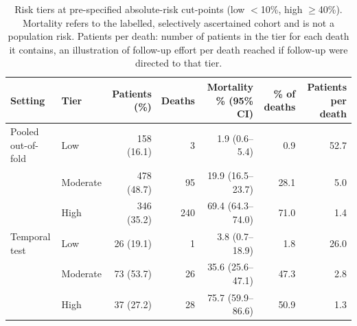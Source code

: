 \begin{table}[htbp]\centering\footnotesize
\caption{Risk tiers at pre-specified absolute-risk cut-points (low $<$10\%, high $\ge$40\%). Mortality refers to the labelled, selectively ascertained cohort and is not a population risk. Patients per death: number of patients in the tier for each death it contains, an illustration of follow-up effort per death reached if follow-up were directed to that tier.}\label{tab:tiers}
\begin{tabular}{llrrrrr}
\toprule
Setting & Tier & Patients (\%) & Deaths & Mortality \% (95\% CI) & \% of deaths & Patients per death \\
\midrule
Pooled out-of-fold & Low & 158 (16.1) & 3 & 1.9 (0.6--5.4) & 0.9 & 52.7 \\
 & Moderate & 478 (48.7) & 95 & 19.9 (16.5--23.7) & 28.1 & 5.0 \\
 & High & 346 (35.2) & 240 & 69.4 (64.3--74.0) & 71.0 & 1.4 \\
Temporal test & Low & 26 (19.1) & 1 & 3.8 (0.7--18.9) & 1.8 & 26.0 \\
 & Moderate & 73 (53.7) & 26 & 35.6 (25.6--47.1) & 47.3 & 2.8 \\
 & High & 37 (27.2) & 28 & 75.7 (59.9--86.6) & 50.9 & 1.3 \\
\bottomrule
\end{tabular}
\end{table}
